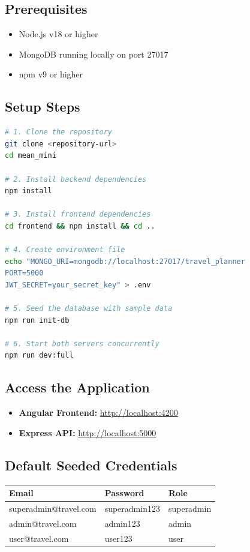 \documentclass[12pt,a4paper]{article}
\begin{document}
\subsection{Prerequisites}
\begin{itemize}
    \item Node.js v18 or higher
    \item MongoDB running locally on port 27017
    \item npm v9 or higher
\end{itemize}

\subsection{Setup Steps}

\begin{lstlisting}[language=bash]
# 1. Clone the repository
git clone <repository-url>
cd mean_mini

# 2. Install backend dependencies
npm install

# 3. Install frontend dependencies
cd frontend && npm install && cd ..

# 4. Create environment file
echo "MONGO_URI=mongodb://localhost:27017/travel_planner
PORT=5000
JWT_SECRET=your_secret_key" > .env

# 5. Seed the database with sample data
npm run init-db

# 6. Start both servers concurrently
npm run dev:full
\end{lstlisting}

\subsection{Access the Application}

\begin{itemize}
    \item \textbf{Angular Frontend:} \url{http://localhost:4200}
    \item \textbf{Express API:} \url{http://localhost:5000}
\end{itemize}

\subsection{Default Seeded Credentials}

\begin{longtable}{>{\ttfamily}p{5cm} >{\ttfamily}p{4cm} p{3cm}}
\toprule
\normalfont\textbf{Email} & \normalfont\textbf{Password} & \normalfont\textbf{Role} \\
\midrule
\endhead
superadmin@travel.com & superadmin123 & superadmin \\
admin@travel.com & admin123 & admin \\
user@travel.com & user123 & user \\
\bottomrule
\end{longtable}
\end{document}
